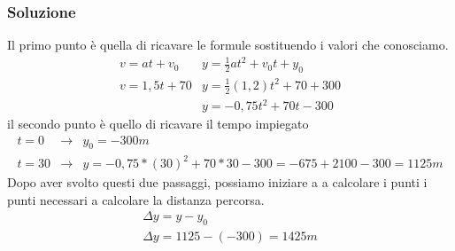 \documentclass{book}
\begin{document}
\subsubsection{Soluzione}
Il primo punto è quella di ricavare le formule sostituendo i valori che
conosciamo.
\begin{equation}
	\begin{matrix}
		v=at+v_0&y=\frac{1}{2}at^2+v_0t+y_0\\
		v=1,5t+70&y=\frac{1}{2}(1,2)t^2+70+300\\
		&y=-0,75t^2+70t-300
	\end{matrix}
\end{equation}
il secondo punto è quello di ricavare il tempo impiegato
\begin{equation}
	\begin{matrix}
		t=0&\to&y_0=-300m\\
		t=30&\to&y=-0,75*(30)^2+70*30-300=-675+2100-300=1125m
	\end{matrix}
\end{equation}
Dopo aver svolto questi due passaggi, possiamo iniziare a a calcolare i punti i
punti necessari a calcolare la distanza percorsa.
\begin{equation}
	\begin{matrix}
		\Delta y=y-y_0\\
		\Delta y=1125-(-300)=1425m
	\end{matrix}
\end{equation}
\end{document}
